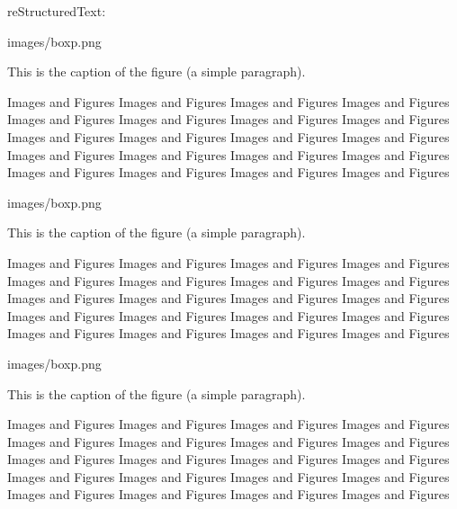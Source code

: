 \documentclass[letterpaper,12pt,english]{sphinxmanual}
\begin{document}
reStructuredText:

\begin{sphinxVerbatim}[commandchars=\\\{\}]
  images/boxp.png
    
    
    
    
    

   This is the caption of the figure (a simple paragraph).

Images and Figures Images and Figures Images and Figures Images and Figures Images and Figures
Images and Figures Images and Figures Images and Figures Images and Figures Images and Figures
Images and Figures Images and Figures Images and Figures Images and Figures Images and Figures
Images and Figures Images and Figures Images and Figures Images and Figures Images and Figures

  images/boxp.png
    
    
    
    
    

   This is the caption of the figure (a simple paragraph).

Images and Figures Images and Figures Images and Figures Images and Figures Images and Figures
Images and Figures Images and Figures Images and Figures Images and Figures Images and Figures
Images and Figures Images and Figures Images and Figures Images and Figures Images and Figures
Images and Figures Images and Figures Images and Figures Images and Figures Images and Figures


  images/boxp.png
    
    
    
    
    

   This is the caption of the figure (a simple paragraph).

Images and Figures Images and Figures Images and Figures Images and Figures Images and Figures
Images and Figures Images and Figures Images and Figures Images and Figures Images and Figures
Images and Figures Images and Figures Images and Figures Images and Figures Images and Figures
Images and Figures Images and Figures Images and Figures Images and Figures Images and Figures
\end{sphinxVerbatim}
\end{document}
